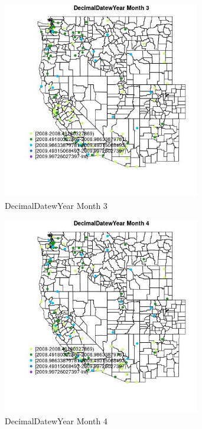\begin{figure} 
\centering  
\includegraphics[width=0.77\textwidth]{Code_Outputs/Report_ML_input_PM25_Step4_part_e_de_duplicated_aves_MapObsMo3DecimalDatewYear.jpg} 
\caption{\label{fig:Report_ML_input_PM25_Step4_part_e_de_duplicated_avesMapObsMo3DecimalDatewYear}DecimalDatewYear Month 3} 
\end{figure} 
 

\begin{figure} 
\centering  
\includegraphics[width=0.77\textwidth]{Code_Outputs/Report_ML_input_PM25_Step4_part_e_de_duplicated_aves_MapObsMo4DecimalDatewYear.jpg} 
\caption{\label{fig:Report_ML_input_PM25_Step4_part_e_de_duplicated_avesMapObsMo4DecimalDatewYear}DecimalDatewYear Month 4} 
\end{figure} 
 

